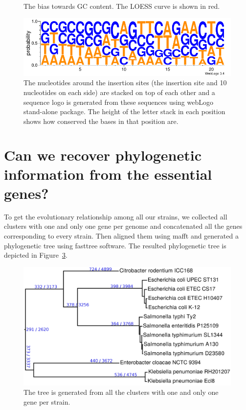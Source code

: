\documentclass[a4paper,10pt, twocolumn]{article}
\begin{document}
\begin{figure}
\begin{tabular}{c c}
\end{tabular}
\caption{The bias towards GC content. The LOESS curve is shown in red.}
\label{fig:GC_bias}
\end{figure}

\begin{figure}
\includegraphics[scale=.98, angle = -90]{logo.pdf}
\caption{The nucleotides around the insertion sites (the insertion site and 10 nucleotides on each side) are stacked on top of each other and a sequence logo is generated from these sequences using webLogo stand-alone package. The height of the letter stack in each position shows how conserved the bases in that position are.}
\label{fig:logo}
\end{figure}

\section{Can we recover phylogenetic information from the essential genes?}
To get the evolutionary relationship among all our strains, we collected all clusters with one and only one gene per genome and concatenated all the genes corresponding to every strain. Then aligned them using mafft and generated a phylogenetic tree using fasttree software. The resulted phylogenetic tree is depicted in Figure~\ref{fig:species-tree}.

\begin{figure}
\includegraphics[scale=0.14]{../speciestree/speciestree-annotated.png}
\caption{The tree is generated from all the clusters with one and only one gene per strain.}
\label{fig:species-tree}
\end{figure}
\end{document}
